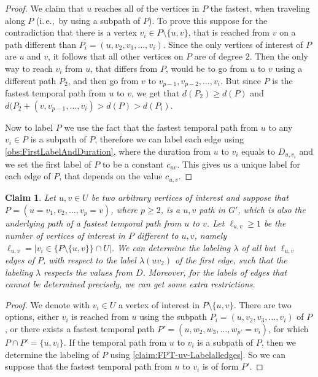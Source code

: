\documentclass[11pt,a4paper]{article}
\newtheorem{claim}[theorem]{Claim}
\theoremstyle{remark}
\theoremstyle{definition}
\newcommand{\ie}{i.\,e.,\ }
\begin{document}
\begin{proof}
We claim that $u$ reaches all of the vertices in $P$ the fastest, when traveling along $P$ (\ie by using a subpath of $P$).
To prove this suppose for the contradiction that there is a vertex $v_i \in P \setminus \{u,v\}$, that is reached from $v$ on a path different than $P_i = (u, v_2, v_3, \dots, v_i)$.
Since the only vertices of interest of $P$ are $u$ and $v$, it follows that all other vertices on $P$ are of degree $2$. 
Then the only way to reach $v_i$ from $u$, that differs from $P$, would be to go from $u$ to $v$ using a different path $P_2$,
and then go from $v$ to $v_{p-1}, v_{p-2}, \dots, v_i$.
But since $P$ is the fastest temporal path from $u$ to $v$, we get that $d(P_2) \geq d(P)$ and $d(P_2 + (v,v_{p-1}, \dots, v_i) > d(P) > d(P_i)$.

Now to label $P$ we use the fact that the fastest temporal path from $u$ to any $v_i \in P$ is a subpath of $P$, 
therefore we can label each edge using \cref{obs:FirstLabelAndDuration},
where the duration from $u$ to $v_i$ equals to $D_{u,v_i}$ and 
we set the first label of $P$ to be a constant $c_{uv}$.
This gives us a unique label for each edge of $P$, that depends on the value $c_{u,v}$.
\end{proof}

\begin{claim}\label{claim:FPT-uv-LabelAlmostalledges}
    Let $u, v \in U$ be two arbitrary vertices of interest and suppose that $P = (u=v_1, v_2, \dots, v_p = v)$, where $p \geq 2$, 
    is a $u,v$ path in $G'$, which is also the underlying path of a fastest temporal path from $u$ to $v$.
    Let $\ell_{u,v} \geq 1$ be the number of vertices of interest in $P$ different to $u,v$, namely $\ell_{u,v} = | v_i \in \{P \setminus \{u,v \} \} \cap U |$.
    We can determine the labeling $\lambda$ of all but $\ell_{u,v}$ edges of $P$, with respect to the label $\lambda(uv_2)$ of the first edge,
    such that the labeling $\lambda$ respects the values from $D$.
    Moreover, for the labels of edges that cannot be determined precisely, we can get some extra restrictions.
\end{claim}

\begin{proof}
We denote with $v_i \in U$ a vertex of interest in $P \setminus \{u,v\}$.
There are two options, either $v_i$ is reached from $u$ using the subpath $P_i = (u, v_2, v_3, \dots, v_i)$ of $P$,
or there exists a fastest temporal path $P' = (u, w_2, w_3, \dots, w_{p'} = v_i)$, for which $P \cap P' = \{u, v_i\}$.
If the temporal path from $u$ to $v_i$ is a subpath of $P$, then we determine the labeling of $P$ using \cref{claim:FPT-uv-Labelalledges}.
So we can suppose that the fastest temporal path from $u$ to $v_i$ is of form $P'$.
\end{proof}
\end{document}
